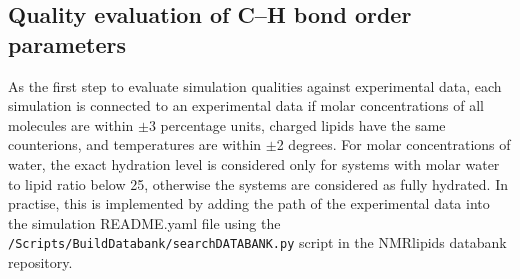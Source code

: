 \documentclass[fleqn,10pt]{wlscirep}
\begin{document}
\subsection{Quality evaluation of C--H bond order parameters}
As the first step to evaluate simulation qualities against experimental data, each simulation is connected to an experimental data if molar concentrations of all molecules are within $\pm$3 percentage units, charged lipids have the same counterions, and temperatures are within $\pm$2 degrees. For molar concentrations of water, the exact hydration level is considered only for systems with molar water to lipid ratio below 25, otherwise the systems are considered as fully hydrated. In practise, this is implemented by adding the path of the experimental data into the simulation README.yaml file using the \texttt{/Scripts/BuildDatabank/searchDATABANK.py} script in the NMRlipids databank repository. 

%
\end{document}
